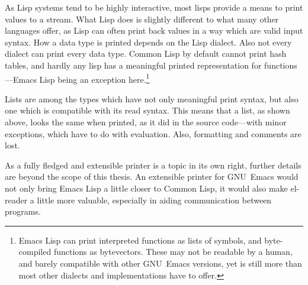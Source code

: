 \documentclass[a4paper,10pt,twoside]{report}
\newcommand{\el}{Emacs Lisp}
\newcommand{\cl}{Common Lisp}
\newcommand{\elr}{el-reader}
\newcommand{\emacs}{GNU~Emacs}
\begin{document}
As Lisp systems tend to be highly interactive, most lisps provide a means to
print values to a stream.  What Lisp does is slightly different to what many
other languages offer, as Lisp can often print back values in a way which are
valid input syntax.  How a data type is printed depends on the Lisp dialect.
Also not every dialect can print every data type.  Common Lisp by default cannot
print hash tables, and hardly any lisp has a meaningful printed representation
for functions---\el{} being an exception here.\footnote{\el{} can print
  interpreted functions as lists of symbols, and byte-compiled functions as
  bytevectors.  These may not be readable by a human, and barely compatible with
  other \emacs{} versions, yet is still more than most other dialects and
  implementations have to offer.}

Lists are among the types which have not only meaningful print syntax, but also
one which is compatible with its read syntax.  This means that a list, as shown
above, looks the same when printed, as it did in the source code---with minor
exceptions, which have to do with evaluation.  Also, formatting and comments are
lost.

As a fully fledged and extensible printer is a topic in its own right, further
details are beyond the scope of this thesis.  An extensible printer for \emacs{}
would not only bring \el{} a little closer to \cl{}, it would also make \elr{} a
little more valuable, especially in aiding communication between programs.




\begin{comment}
  The reason why lisp code has so many parentheses, is that parentheses denote a
  list in Lisp.  Expressions in general, save the most trivial ones, are
  represented of lists containing other lists and symbols.\footnote{Plus of
    course other entities such as numbers, yet these are not relevant to this
    discussion.}
\end{comment}
\end{document}
